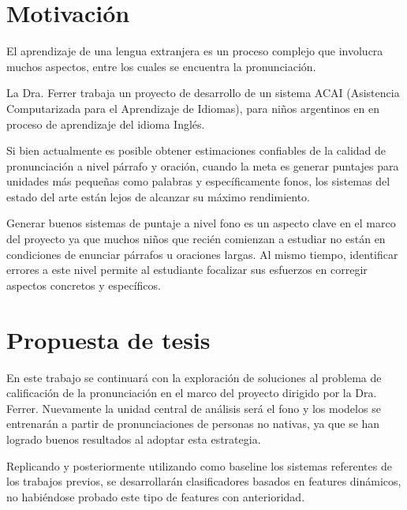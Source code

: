 \documentclass[a4paper,12pt]{article} %
\begin{document}
\section{Motivación}

El aprendizaje de una lengua extranjera es un proceso complejo que involucra muchos 
aspectos, entre los cuales se encuentra la pronunciación.

La Dra. Ferrer trabaja un proyecto de desarrollo de un sistema ACAI (Asistencia
Computarizada para el Aprendizaje de Idiomas), para niños argentinos en en proceso de
aprendizaje del idioma Inglés.

Si bien actualmente es posible obtener estimaciones confiables de la calidad
de pronunciación a nivel párrafo y oración, cuando la meta es generar puntajes 
para unidades más pequeñas como palabras y específicamente fonos, los sistemas del
estado del arte están lejos de alcanzar su máximo rendimiento.

Generar buenos sistemas de puntaje a nivel fono es un aspecto clave en el marco del
proyecto ya que muchos niños que recién comienzan a estudiar no están en condiciones
de enunciar párrafos u oraciones largas. Al mismo tiempo, identificar errores a este
nivel permite al estudiante focalizar sus esfuerzos en corregir aspectos concretos
y específicos.


\section{Propuesta de tesis}

En este trabajo se continuará con la exploración de soluciones al problema de calificación
de la pronunciación en el marco del proyecto dirigido por la Dra. Ferrer. Nuevamente 
la unidad central de análisis será el fono y los modelos se entrenarán 
a partir de pronunciaciones de personas no nativas, ya que se han logrado buenos resultados al adoptar esta estrategia. 

Replicando y posteriormente utilizando como baseline los sistemas referentes de los trabajos
previos, se desarrollarán clasificadores basados en features dinámicos, no habiéndose 
probado este tipo de features con anterioridad.

\end{document}
